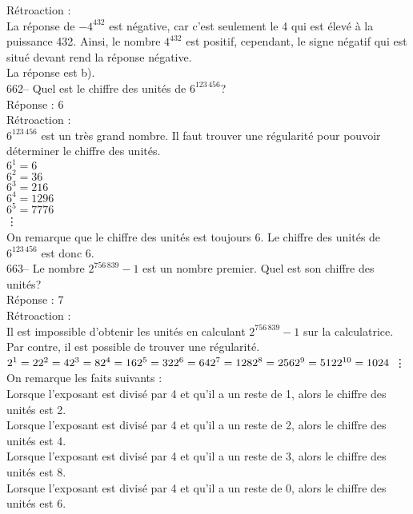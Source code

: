 ﻿\documentclass[letterpaper, 12pt]{article}
\begin{document}
R\'etroaction : \\
La r\'eponse de $-4^{432}$ est n\'egative, car c'est seulement le 4
qui est \'elev\'e \`a la puissance 432. Ainsi, le nombre $4^{432}$
est positif,
cependant, le signe n\'egatif qui est situ\'e devant rend la r\'eponse
n\'egative.\\
La r\'eponse est b).\\

662-- Quel est le chiffre des unit\'es de $6^{123\,456}$?\\

R\'eponse : 6\\

R\'etroaction : \\
$6^{123\,456}$ est un tr\`es grand nombre.  Il faut trouver une
r\'egularit\'e pour pouvoir d\'eterminer le chiffre des unit\'es.\\
$6^{1}=6$\\
$6^{2}=36$\\
$6^{3}=216$\\
$6^{4}=1296$\\
$6^{5}=7776$\\
\vdots\\
On remarque que le chiffre des unit\'es est toujours 6.  Le chiffre des
unit\'es de $6^{123\,456}$ est donc 6.  \\

663--  Le nombre $2^{756\,839}-1$ est un nombre premier.  Quel est son
chiffre des unit\'es?\\

R\'eponse : 7\\

R\'etroaction : \\
Il est impossible d'obtenir les unit\'es en calculant $2^{756\,839}-1$ sur
la calculatrice.  Par contre, il est possible de trouver une r\'egularit\'e.
  \\
$2^{1}  = 2\\
2^{2}  = 4\\
2^{3}  = 8\\
2^{4} = 16\\
2^{5}  = 32\\
2^{6}  = 64\\
2^{7}  = 128\\
2^{8}= 256\\
2^{9}  = 512\\
2^{10} = 1024\\$ \vdots\\
On remarque les faits suivants :\\
Lorsque l'exposant est divis\'e par 4 et qu'il a un reste de 1, alors le
chiffre des unit\'es est 2.\\
Lorsque l'exposant est divis\'e par 4 et qu'il a un reste de 2, alors le
chiffre des unit\'es est 4.\\
Lorsque l'exposant est divis\'e par 4 et qu'il a un reste de 3, alors le
chiffre des unit\'es est 8.\\
Lorsque l'exposant est divis\'e par 4 et qu'il a un reste de 0, alors le
chiffre des unit\'es est 6.\\
\end{document}
